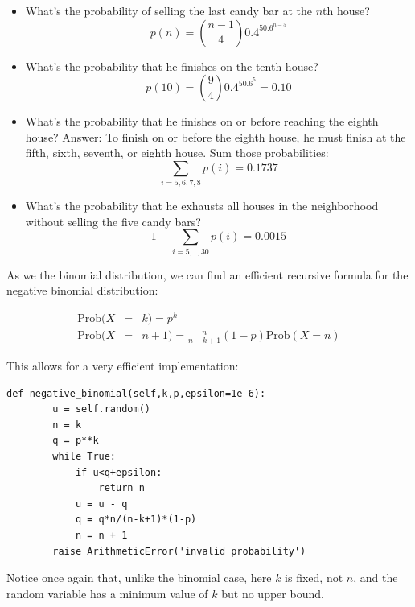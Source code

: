 \documentclass[justified,sixbynine]{tufte-book}
\def\ft{\small\tt}
\theoremstyle{plain}%
\theoremstyle{definition}
\theoremstyle{remark}
\begin{document}
\begin{fullwidth}
\begin{itemize}
\item  What's the probability of selling the last candy bar at the $n$th house?
\begin{equation}
p(n)=\binom{n-1}40.4^50.6^{n-5}
\end{equation}

\item  What's the probability that he finishes on the tenth house?
\begin{equation}
p(10)=\binom 940.4^50.6^5=0.10
\end{equation}

\item  What's the probability that he finishes on or before reaching the
eighth house? Answer: To finish on or before the eighth house, he must
finish at the fifth, sixth, seventh, or eighth house. Sum those
probabilities:
\begin{equation}
\sum_{i=5,6,7,8}p(i)=0.1737
\end{equation}

\item  What's the probability that he exhausts all houses in the
neighborhood without selling the five candy bars?
\begin{equation}
1-\sum_{i=5,..,30}p(i)=0.0015
\end{equation}
\end{itemize}

As we the binomial distribution, we can find an efficient recursive formula for the 
negative binomial distribution:

\begin{eqnarray}
\textrm{Prob}(X &=& k) = p^k \\
\textrm{Prob}(X &=& n+1)=\frac{n}{n-k+1}(1-p)\textrm{Prob}(X=n)
\end{eqnarray}

This allows for a very efficient implementation:

\begin{lstlisting}[caption={in file: {\ft nlib.py}}]
    def negative_binomial(self,k,p,epsilon=1e-6):        
        u = self.random()
        n = k 
        q = p**k
        while True:
            if u<q+epsilon:
                return n
            u = u - q
            q = q*n/(n-k+1)*(1-p)
            n = n + 1
        raise ArithmeticError('invalid probability')
\end{lstlisting}

Notice once again that, unlike the binomial case, here $k$ is fixed, not $n$, and the random variable has a minimum value of $k$ but no upper bound.


\end{fullwidth}
\end{document}

